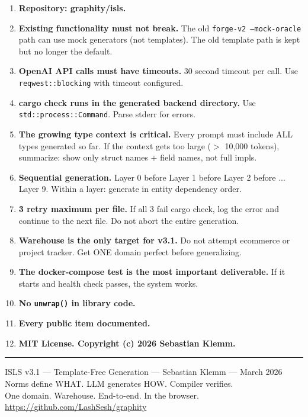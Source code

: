 \documentclass[11pt,a4paper]{article}
\begin{document}
\begin{enumerate}
\item \textbf{Repository: graphity/isls.}
\item \textbf{Existing functionality must not break.}
  The old \texttt{forge-v2 --mock-oracle} path can use mock
  generators (not templates). The old template path is kept
  but no longer the default.
\item \textbf{OpenAI API calls must have timeouts.}
  30 second timeout per call. Use \texttt{reqwest::blocking}
  with timeout configured.
\item \textbf{cargo check runs in the generated backend directory.}
  Use \texttt{std::process::Command}. Parse stderr for errors.
\item \textbf{The growing type context is critical.}
  Every prompt must include ALL types generated so far.
  If the context gets too large ($>$ 10,000 tokens), summarize:
  show only struct names + field names, not full impls.
\item \textbf{Sequential generation.}
  Layer 0 before Layer 1 before Layer 2 before ... Layer 9.
  Within a layer: generate in entity dependency order.
\item \textbf{3 retry maximum per file.}
  If all 3 fail cargo check, log the error and continue to
  the next file. Do not abort the entire generation.
\item \textbf{Warehouse is the only target for v3.1.}
  Do not attempt ecommerce or project tracker. Get ONE domain
  perfect before generalizing.
\item \textbf{The docker-compose test is the most important
  deliverable.} If it starts and health check passes, the system
  works.
\item \textbf{No \texttt{unwrap()} in library code.}
\item \textbf{Every public item documented.}
\item \textbf{MIT License. Copyright (c) 2026 Sebastian Klemm.}
\end{enumerate}

\vfill
\noindent\rule{\textwidth}{0.4pt}
\begin{center}
\small
ISLS v3.1 --- Template-Free Generation --- Sebastian Klemm --- March 2026\\
Norms define WHAT. LLM generates HOW. Compiler verifies.\\
One domain. Warehouse. End-to-end. In the browser.\\
\url{https://github.com/LashSesh/graphity}
\end{center}
\end{document}
